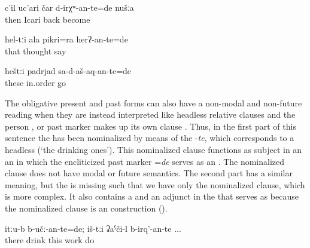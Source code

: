 \begin{exe}
	\ex	\label{ex:Then we had to be back in Icari analytic}
	\gll	c'il	uc'ari	čar	d-irχʷ-an-te=de	nušːa\\
		then	Icari	back	become	\\
	\glt	{}

	\ex	\label{ex:(You) should have told your thoughts analytic}
	\gll	hel-tːi	ala	pikri=ra	herʔ-an-te=de\\
		that		thought		say\\
	\glt	{}

	\ex	\label{ex:‎‎These (pictures) should have been come in the right order}
	\gll	heštːi	padrjad	sa-d-aš-aq-an-te=de\\
		these	in.order	go\\
	\glt	{}
\end{exe}

The obligative present and past forms can also have a non-modal and non-future reading when they are instead interpreted like headless relative clauses and the person ,  or past marker makes up its own  clause . Thus, in the first part of this sentence the  has been nominalized by means of the  -\textit{te}, which corresponds to a headless  (`the drinking ones'). This nominalized clause functions as subject in an an  in which the encliticized past marker =\textit{de} serves as an . The nominalized clause does not have modal or future semantics. The second part has a similar meaning, but the  is missing such that we have only the nominalized clause, which is more complex. It also contains a  and an adjunct in the  that serves as  because the nominalized clause is an  construction ().

\begin{exe}
	\ex	\label{ex:There were the drinking ones; these (are) the working ones}
	\gll	itːu-b	b-učː-an-te=de;	iš-tːi	ʡaˁči-l	b-irq'-an-te ...\\
		there	drink	this	work	do\\
	\glt	{}
\end{exe}


